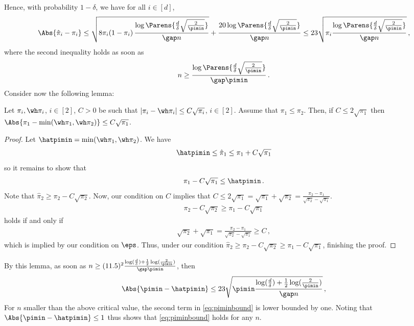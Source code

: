 Hence, with probability $1-\delta$, we have for all $i\in [d]$,
\begin{align}
\label{eq:singletonboundsimple}
\Abs{\hat{\pi}_i-\pi_i}
\le
\sqrt{ 8 \pi_i(1-\pi_i) 
\,\frac{
\log\Parens{\frac{d}\delta\sqrt{\frac{2}{\pimin}}}
  }{\gap n}}
+
\frac{20
  \log\Parens{\frac{d}\delta\sqrt{\frac{2}{\pimin}}}
}{\gap n}
\le
23 \sqrt{  \pi_i 
	\frac{\log\Parens{\frac{d}\delta\sqrt{\frac{2}{\pimin}}}
           }{\gap n}
       }\,,
\end{align}
where the second inequality holds as soon as 
\[
n \ge
	\frac{\log\Parens{\frac{d}\delta\sqrt{\frac{2}{\pimin}}}
           }{\gap \pimin}\,.
\]
Consider now the following lemma:
\begin{lemma}
Let  $\pi_i,\wh\pi_i$, $i\in [2]$, $C>0$ be
such that $|\pi_i - \wh\pi_i| \le C \sqrt{\pi_i}$, $i\in [2]$.
Assume that $\pi_1\le \pi_2$.
Then, if $C\le 2\sqrt{\pi_1}$ then $\Abs{\pi_1 - \min(\wh\pi_1,\wh\pi_2) } \le C \sqrt{\pi_1}$.
\end{lemma}
\begin{proof}
Let $\hatpimin = \min(\wh\pi_1,\wh\pi_2)$.
We have
\begin{align*}
\hatpimin \le \hat{\pi}_1 \le  \pi_1 + C \sqrt{\pi_1}
\end{align*}
so it remains to show that
\begin{align*}
\pi_1 - C \sqrt{\pi_1} \le \hatpimin\,.
\end{align*}
Note that $\hat\pi_2 \ge \pi_2- C \sqrt{\pi_2 } $. Now,
our condition on $C$ implies that $C \le 2 \sqrt{\pi_1} = \sqrt{\pi_1}+\sqrt{\pi_2} = \frac{\pi_2 - \pi_1}{\sqrt{\pi_2}-\sqrt{\pi_1}}$. 
\begin{align*}
\pi_2 - C \sqrt{\pi_2  } \ge \pi_1 - C \sqrt{\pi_1 }
\end{align*}
holds if and only if
\begin{align*}
\sqrt{\pi_2} + \sqrt{\pi_1} = \frac{\pi_2 - \pi_1}{\sqrt{\pi_2} -\sqrt{\pi_1}} \ge C \,,
\end{align*}
which is implied by our condition on $\eps$. Thus, under our condition $\hat\pi_2 \ge \pi_2 - C  \sqrt{\pi_2 } \ge \pi_1 - C \sqrt{\pi_1}$, finishing the proof.
\end{proof}
By this lemma, as soon as $n\ge (11.5)^2 \frac{\log( \frac{d}{\delta} )+\frac12\log(\frac2\pimin) }{ \gap\pimin}$,
then
\[
\Abs{\pimin - \hatpimin} \le 23 \sqrt{ \pimin \frac{\log( \frac{d}{\delta} )+\frac12\log(\frac2\pimin) }{ \gap n} }\,,
\]
For $n$ smaller than the above critical value, the second term in \eqref{eq:piminbound} is lower bounded by one.
Noting that $\Abs{\pimin-\hatpimin}\le 1$ thus shows that \eqref{eq:piminbound} holds for any $n$.


